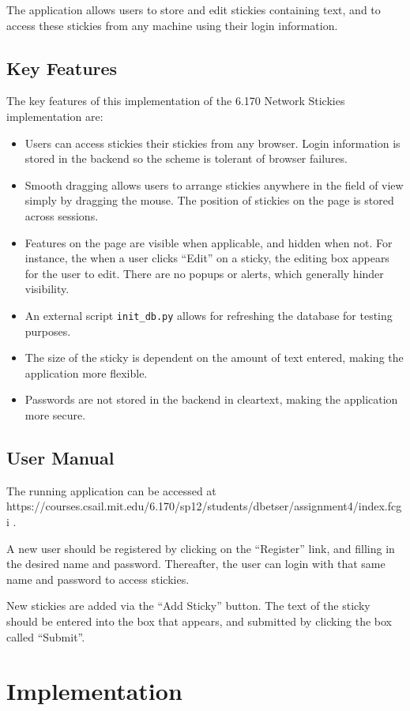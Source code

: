 \documentclass[11pt,letterpaper]{article}
\begin{document}
The application allows users to store and edit stickies containing text, and to access these stickies from any machine using their login information.

\subsection{Key Features}
The key features of this implementation of the 6.170 Network Stickies implementation are:
\begin{itemize}
\item Users can access stickies their stickies from any browser. Login information is stored in the backend so the scheme is tolerant of browser failures.
\item Smooth dragging allows users to arrange stickies anywhere in the field of view simply by dragging the mouse. The position of stickies on the page is stored across sessions.
\item Features on the page are visible when applicable, and hidden when not. For instance, the when a user clicks ``Edit'' on a sticky, the editing box appears for the user to edit. There are no popups or alerts, which generally hinder visibility.
\item An external script \texttt{init\_db.py} allows for refreshing the database for testing purposes.
\item The size of the sticky is dependent on the amount of text entered, making the application more flexible.
\item Passwords are not stored in the backend in cleartext, making the application more secure.
\end{itemize}

\subsection{User Manual}
The running application can be accessed at https://courses.csail.mit.edu/6.170/sp12/students/dbetser/assignment4/index.fcgi .

A new user should be registered by clicking on the ``Register'' link, and filling in the desired name and password. Thereafter, the user can login with that same name and password to access stickies.

New stickies are added via the ``Add Sticky'' button. The text of the sticky should be entered into the box that appears, and submitted by clicking the box called ``Submit''.


\section{Implementation}
\end{document}
